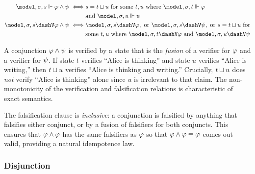 \documentclass[../LogosReference.tex]{subfiles}
\begin{document}
\begin{definition}\label{def:conjunction-verification}
	\begin{align}
		\model, \assignment, s \verifies \metaA \land \metaB \iff
		 & s = \fusion{t}{u} \text{ for some } t, u \text{ where } \model, \assignment, t \verifies \metaA \notag                                           \\
		 & \text{and } \model, \assignment, u \verifies \metaB                                                                                              \\
		\model, \assignment, s \falsifies \metaA \land \metaB \iff
		 & \model, \assignment, s \falsifies \metaA, \text{ or } \model, \assignment, s \falsifies \metaB, \text{ or } s = \fusion{t}{u} \text{ for} \notag \\
		 & \text{some } t, u \text{ where } \model, \assignment, t \falsifies \metaA \text{ and } \model, \assignment, u \falsifies \metaB
	\end{align}
\end{definition}

\begin{remark}
A conjunction $\varphi \land \psi$ is verified by a state that is the \textit{fusion} of a verifier for $\varphi$ and a verifier for $\psi$.
If state $t$ verifies ``Alice is thinking'' and state $u$ verifies ``Alice is writing,'' then $t\sqcup u$ verifies ``Alice is thinking and writing.''
Crucially, $t\sqcup u$ does \textit{not} verify ``Alice is thinking'' alone since $u$ is irrelevant to that claim. The non-monotonicity of the verification and falsification relations is characteristic of exact semantics.

The falsification clause is \textit{inclusive}: a conjunction is falsified by anything that falsifies either conjunct, or by a fusion of falsifiers for both conjuncts.
This ensures that $\varphi \land \varphi$ has the same falsifiers as $\varphi$ so that $\varphi \land \varphi \equiv \varphi$ comes out valid, providing a natural idempotence law.
\end{remark}

\subsubsection{Disjunction}\label{sec:disjunction}
\end{document}
